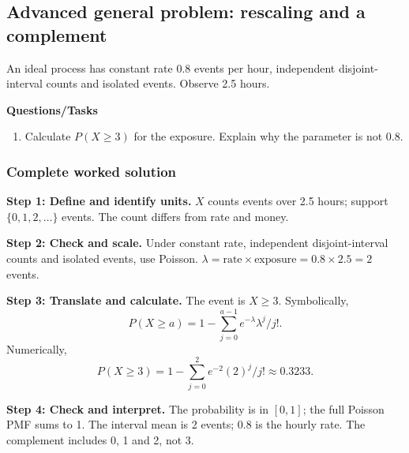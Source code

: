 \subsection{Advanced general problem: rescaling and a complement}
An ideal process has constant rate 0.8 events per hour, independent disjoint-interval counts and isolated events. Observe 2.5 hours.

\textbf{Questions/Tasks}
\begin{enumerate}
\item Calculate $P(X\geq3)$ for the exposure. Explain why the parameter is not 0.8.
\end{enumerate}
\subsubsection*{Complete worked solution}
\par\noindent\begin{minipage}{\linewidth}
\textbf{Step 1: Define and identify units.} $X$ counts events over 2.5 hours; support $\{0,1,2,\ldots\}$ events. The count differs from rate and money.
\end{minipage}\par\medskip
\par\noindent\begin{minipage}{\linewidth}
\textbf{Step 2: Check and scale.} Under constant rate, independent disjoint-interval counts and isolated events, use Poisson. $\lambda=\text{rate}\times\text{exposure}=0.8\times2.5=2$ events.
\end{minipage}\par\medskip
\par\noindent\begin{minipage}{\linewidth}
\textbf{Step 3: Translate and calculate.} The event is $ X\geq3$. Symbolically,
\[P(X\geq a)=1-\sum_{j=0}^{a-1}e^{-\lambda}\lambda^j/j!.\]
Numerically,
\[P(X\geq3)=1-\sum_{j=0}^{2}e^{-2}(2)^j/j!\approx 0.3233.\]
\end{minipage}\par\medskip
\par\noindent\begin{minipage}{\linewidth}
\textbf{Step 4: Check and interpret.} The probability is in $[0,1]$; the full Poisson PMF sums to 1. The interval mean is 2 events; 0.8 is the hourly rate. The complement includes 0, 1 and 2, not 3.
\end{minipage}\par\medskip
